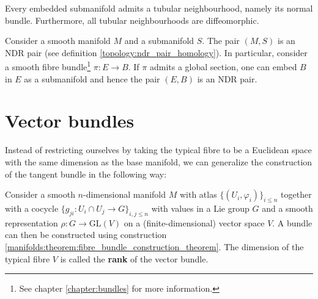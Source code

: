     \begin{theorem}\label{diff:theorem:tubular_neighbourhood}
        Every embedded submanifold admits a tubular neighbourhood, namely its normal bundle. Furthermore, all tubular neighbourhoods are diffeomorphic.
    \end{theorem}
    \begin{result}\label{diff:ndr_submanifold}
        Consider a smooth manifold $M$ and a submanifold $S$. The pair $(M,S)$ is an NDR pair (see definition \ref{topology:ndr_pair_homology}). In particular, consider a smooth fibre bundle\footnote{See chapter \ref{chapter:bundles} for more information.} $\pi:E\rightarrow B$. If $\pi$ admits a global section, one can embed $B$ in $E$ as a submanifold and hence the pair $(E,B)$ is an NDR pair.
    \end{result}

\section{Vector bundles}

    Instead of restricting ourselves by taking the typical fibre to be a Euclidean space with the same dimension as the base manifold, we can generalize the construction of the tangent bundle in the following way:
    \begin{construct}\label{manifolds:vector_bundle_construction}
        Consider a smooth $n$-dimensional manifold $M$ with atlas $\{(U_i,\varphi_i)\}_{i\leq n}$ together with a cocycle $\{g_{ji}:U_i\cap U_j\rightarrow G\}_{i,j\leq n}$ with values in a Lie group $G$ and a smooth representation $\rho:G\rightarrow\text{GL}(V)$ on a (finite-dimensional) vector space $V$. A bundle can then be constructed using construction \ref{manifolds:theorem:fibre_bundle_construction_theorem}. The dimension of the typical fibre $V$ is called the \textbf{rank} of the vector bundle.
    \end{construct}

